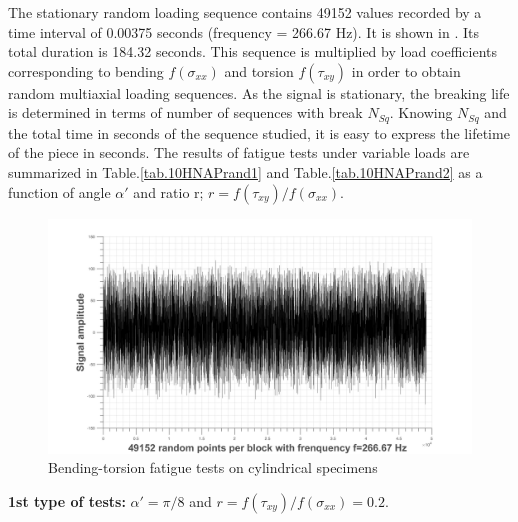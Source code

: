 The stationary random loading sequence contains 49152 values recorded by a time interval of 0.00375 seconds (frequency = 266.67 Hz). It is shown in . Its total duration is 184.32 seconds. This sequence is multiplied by load coefficients corresponding to bending $f (\sigma_{xx})$ and torsion $f (\tau_{xy})$ in order to obtain random multiaxial loading sequences. As the signal is stationary, the breaking life is determined in terms of number of sequences with break $N_{Sq}$. Knowing $N_{Sq}$ and the total time in seconds of the sequence studied, it is easy to express the lifetime of the piece in seconds. The results of fatigue tests under variable loads are summarized in Table.\ref{tab.10HNAPrand1} and Table.\ref{tab.10HNAPrand2} as a function of angle $\alpha'$ and ratio r; $r =f(\tau_{xy})/f(\sigma_{xx})$.
\begin{figure}[!h]
\centering
\includegraphics[width=\textwidth]{figures//10HNAPrandomblock.png} 
\caption{Bending-torsion fatigue tests on cylindrical specimens\cite{carpinteri2003multiaxial}}
\label{fig.10HNAPrandom}
\end{figure}

\textbf{1st type of tests:} $\alpha' = \pi / 8$ and $r =f(\tau_{xy})/f(\sigma_{xx})=0.2$.

